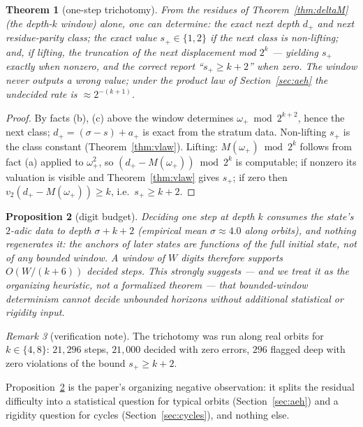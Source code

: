 \documentclass[11pt]{article}
\newtheorem{theorem}{Theorem}[section]
\newtheorem{proposition}[theorem]{Proposition}
\theoremstyle{remark}
\newtheorem{remark}[theorem]{Remark}
\newcommand{\vt}[1]{v_2\!\left(#1\right)}
\newcommand{\w}{\omega}
\newcommand{\wnext}{\w_{+}}
\newcommand{\dnext}{d_{+}}
\begin{document}
\begin{theorem}[one-step trichotomy]\label{thm:onestep}
From the residues of Theorem~\ref{thm:deltaM} (the \emph{depth-$k$ window}) alone, one can determine: the exact next depth $\dnext$ and next residue-parity class; the exact value $s_+ \in \{1,2\}$ if the next class is non-lifting; and, if lifting, the truncation of the next displacement mod $2^k$ --- yielding $s_+$ exactly when nonzero, and the correct report ``$s_+ \ge k+2$'' when zero. The window never outputs a wrong value; under the product law of Section~\ref{sec:aeh} the undecided rate is $\approx 2^{-(k+1)}$.
\end{theorem}

\begin{proof}
By facts (b), (c) above the window determines $\wnext \bmod 2^{k+2}$, hence the next class; $\dnext = (\sigma - s) + a_+$ is exact from the stratum data. Non-lifting $s_+$ is the class constant (Theorem~\ref{thm:vlaw}). Lifting: $M(\wnext) \bmod 2^k$ follows from fact (a) applied to $\wnext^2$, so $(\dnext - M(\wnext)) \bmod 2^k$ is computable; if nonzero its valuation is visible and Theorem~\ref{thm:vlaw} gives $s_+$; if zero then $\vt{\dnext - M(\wnext)} \ge k$, i.e.\ $s_+ \ge k + 2$.
\end{proof}

\begin{proposition}[digit budget]\label{prop:budget}
Deciding one step at depth $k$ consumes the state's $2$-adic data to depth $\sigma + k + 2$ (empirical mean $\sigma \approx 4.0$ along orbits), and nothing regenerates it: the anchors of later states are functions of the full initial state, not of any bounded window. A window of $W$ digits therefore supports $O(W/(k+6))$ decided steps. This strongly suggests --- and we treat it as the organizing heuristic, not a formalized theorem --- that bounded-window determinism cannot decide unbounded horizons without additional statistical or rigidity input.
\end{proposition}

\begin{remark}[verification note]
The trichotomy was run along real orbits for $k \in \{4,8\}$: $21{,}296$ steps, $21{,}000$ decided with zero errors, $296$ flagged deep with zero violations of the bound $s_+ \ge k+2$.
\end{remark}

Proposition~\ref{prop:budget} is the paper's organizing negative observation: it splits the residual difficulty into a statistical question for typical orbits (Section~\ref{sec:aeh}) and a rigidity question for cycles (Section~\ref{sec:cycles}), and nothing else.
\end{document}

